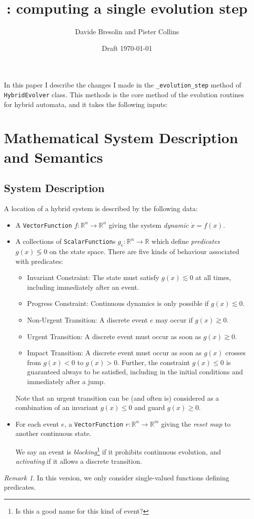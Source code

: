 \documentclass[english,a4paper]{article}
\title{\ARIADNE: computing a single evolution step}
\author{Davide Bresolin and Pieter Collins}
\date{Draft \today}
\newcommand{\R}{\mathbb{R}}
\theoremstyle{theorem}
\theoremstyle{definition}
\theoremstyle{remark}
\newtheorem*{remark*}{Remark}
\begin{document}
\maketitle

\noindent In this paper I describe the changes I made in the \texttt{\_evolution\_step} method of \texttt{HybridEvolver} class. This methods is the core method of the evolution routines for hybrid automata, and it takes the following inputs:

\section{Mathematical System Description and Semantics}

\subsection*{System Description}

A location of a hybrid system is described by the following data:
\begin{itemize}
\item A \texttt{VectorFunction} $f:\R^n \rightarrow \R^n$ giving the system \emph{dynamic} $\dot{x}=f(x)$.
\item A collections of \texttt{ScalarFunction}s $g_e:\R^n\rightarrow \R$ which define \emph{predicates} $g(x)\lessgtr 0$ on the state space.
There are five kinds of behaviour associated with predicates:
 \begin{itemize}
  \item Invariant Constraint: The state must satisfy $g(x)\lesssim 0$ at all times, including immediately after an event.
  \item Progress Constraint: Continuous dynamics is only possible if $g(x)\lesssim 0$.
  \item Non-Urgent Transition: A discrete event $e$ may occur if $g(x)\gtrsim0$.
  \item Urgent Transition: A discrete event must occur as soon as $g(x)\gtrsim 0$.
  \item Impact Transition: A discrete event must occur as soon as $g(x)$ crosses from $g(x)<0$ to $g(x)>0$. Further, the constraint $g(x)\leq 0$ is guaranteed always to be satisfied, including in the initial conditions and immediately after a jump.
 \end{itemize}
Note that an urgent transition can be (and often is) considered as a combination of an invariant $g(x)\leq0$ and guard $g(x)\geq0$.
\item For each event $e$, a \texttt{VectorFunction} $r:\R^n\rightarrow\R^m$ giving the \emph{reset map} to another continuous state.

We say an event is \emph{blocking}\footnote{Is this a good name for this kind of event?} if it prohibits continuous evolution, and \emph{activating} if it allows a discrete transition.\end{itemize}
\begin{remark*}
In this version, we only consider single-valued functions defining predicates.
\end{remark*}
\end{document}
